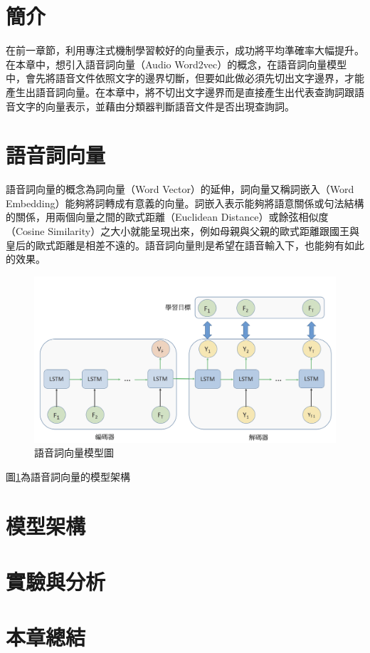\label{sec:chap5}
\section{簡介}
在前一章節，利用專注式機制學習較好的向量表示，成功將平均準確率大幅提升。在本章中，想引入語音詞向量（Audio
Word2vec）的概念，在語音詞向量模型中，會先將語音文件依照文字的邊界切斷，但要如此做必須先切出文字邊界，才能產生出語音詞向量。在本章中，將不切出文字邊界而是直接產生出代表查詢詞跟語音文字的向量表示，並藉由分類器判斷語音文件是否出現查詢詞。
\section{語音詞向量}
語音詞向量的概念為詞向量（Word Vector）的延伸，詞向量又稱詞嵌入（Word
Embedding）能夠將詞轉成有意義的向量。詞嵌入表示能夠將語意關係或句法結構的關係，用兩個向量之間的歐式距離（Euclidean
Distance）或餘弦相似度（Cosine
Similarity）之大小就能呈現出來，例如母親與父親的歐式距離跟國王與皇后的歐式距離是相差不遠的。語音詞向量則是希望在語音輸入下，也能夠有如此的效果。
\begin{figure}[h]
\centering
\includegraphics[scale=0.5]{images/ch5_seq2seq.png} 
\caption{語音詞向量模型圖}
\label{ch5_seq2seq}
\end{figure}
\label{ch5_seq2seq}
圖\ref{ch5_seq2seq}為語音詞向量的模型架構
\section{模型架構}
\section{實驗與分析}
\section{本章總結}
